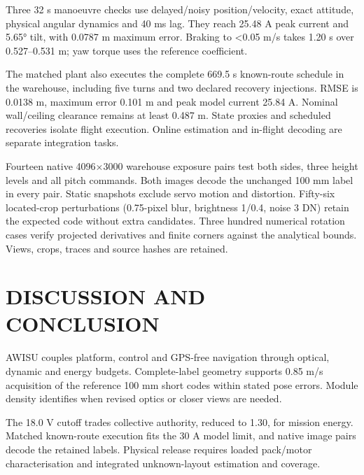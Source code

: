 \documentclass[a4paper,11pt]{article}
\begin{document}
Three 32 s manoeuvre checks use delayed/noisy position/velocity, exact attitude, physical angular dynamics and 40 ms lag. They reach 25.48 A peak current and 5.65° tilt, with 0.0787 m maximum error. Braking to <0.05 m/s takes 1.20 s over 0.527–0.531 m; yaw torque uses the reference coefficient.

The matched plant also executes the complete 669.5 s known-route schedule in the warehouse, including five turns and two declared recovery injections. RMSE is 0.0138 m, maximum error 0.101 m and peak model current 25.84 A. Nominal wall/ceiling clearance remains at least 0.487 m. State proxies and scheduled recoveries isolate flight execution. Online estimation and in-flight decoding are separate integration tasks.

Fourteen native 4096×3000 warehouse exposure pairs test both sides, three height levels and all pitch commands. Both images decode the unchanged 100 mm label in every pair. Static snapshots exclude servo motion and distortion. Fifty-six located-crop perturbations (0.75-pixel blur, brightness 1/0.4, noise 3 DN) retain the expected code without extra candidates. Three hundred numerical rotation cases verify projected derivatives and finite corners against the analytical bounds. Views, crops, traces and source hashes are retained.

\section{D{\fontsize{11.2}{14}\selectfont ISCUSSION} {\fontsize{11.2}{14}\selectfont AND} C{\fontsize{11.2}{14}\selectfont ONCLUSION}}
AWISU couples platform, control and GPS-free navigation through optical, dynamic and energy budgets. Complete-label geometry supports 0.85 m/s acquisition of the reference 100 mm short codes within stated pose errors. Module density identifies when revised optics or closer views are needed.

The 18.0 V cutoff trades collective authority, reduced to 1.30, for mission energy. Matched known-route execution fits the 30 A model limit, and native image pairs decode the retained labels. Physical release requires loaded pack/motor characterisation and integrated unknown-layout estimation and coverage.
\end{document}
